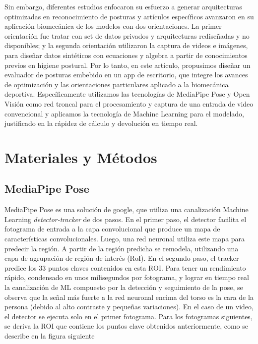 \documentclass[twoside,11pt]{article}
\begin{document}
Sin embargo, diferentes estudios enfocaron su esfuerzo a generar 
arquitecturas optimizadas en reconocimiento de posturas y artículos específicos avanzaron 
en su aplicación biomecánica de los modelos con dos orientaciones. La primer orientación fue tratar 
con set de datos privados y arquitecturas rediseñadas y no disponibles; 
y la segunda orientación utilizaron la captura de videos e imágenes, para diseñar 
datos sintéticos con ecuaciones y algebra a partir de conocimientos previos
 en higiene postural.
Por lo tanto, en este artículo, propusimos diseñar un evaluador de posturas
embebido en un app de escritorio, que integre los avances de optimización y
 las orientaciones particulares aplicado a la biomecánica deportiva. 
Específicamente utilizamos las tecnologías de MediaPipe Pose y Open Visión como red
troncal para el procesamiento y captura de una entrada de video convencional y 
aplicamos la tecnología de Machine Learning para el modelado,
justificado en la rápidez de cálculo y devolución en tiempo real.




\section{Materiales y Métodos}

\subsection{MediaPipe Pose}
MediaPipe Pose es una solución de google, que utiliza 
una canalización Machine Learning \textit{detector-tracker}
de dos pasos. En el primer paso, el detector facilita 
el fotograma de entrada a la capa convolucional 
que produce un mapa de características convolucionales. 
Luego, una red neuronal utiliza este mapa para predecir 
la región. A partir de la región predicha se remodela, 
utilizando una capa de agrupación de región de interés (RoI). 
En el segundo paso, el tracker predice los 33 puntos claves
 contenidos en esta ROI. Para tener un rendimiento rápido, 
 condensado en unos milisegundos por fotograma, y lograr 
 en tiempo real la canalización de ML compuesto por la 
 detección y seguimiento de la pose, se observa que la 
 señal más fuerte a la red neuronal encima del torso es 
 la cara de la persona (debido al alto contraste y pequeñas variaciones). 
 En el caso de un video, el detector se ejecuta solo 
 en el primer fotograma. Para los fotogramas siguientes, 
 se deriva la ROI que contiene los puntos clave obtenidos 
 anteriormente, como se describe en la figura siguiente
\end{document}
